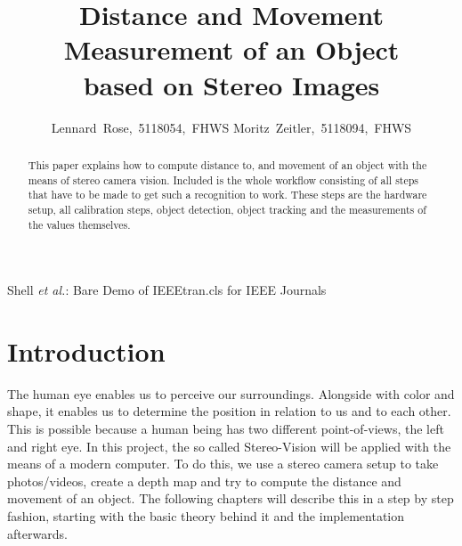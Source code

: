 \documentclass[journal,onecolumn]{IEEEtran}
\begin{document}
	\title{Distance and Movement Measurement of an Object\\ based on Stereo Images}

	\author{Lennard~Rose,~5118054,~FHWS
		Moritz~Zeitler,~5118094,~FHWS%
	}
	{Shell \MakeLowercase{\textit{et al.}}: Bare Demo of IEEEtran.cls for IEEE Journals}

	\maketitle

	\begin{abstract}
		\noindent
		This paper explains how to compute distance to, and movement of an object with the means of stereo camera vision.
		Included is the whole workflow consisting of all steps that have to be made to get such a recognition to work. These steps are the hardware setup, all calibration steps, object detection, object tracking and the measurements of the values themselves.
	\end{abstract}


	\IEEEpeerreviewmaketitle

	\section{Introduction}
\label{sec:einfuehrung}
\noindent
The human eye enables us to perceive our surroundings. Alongside with color and shape, it enables us to determine the position in relation to us and to each other. This is possible because a human being has two different point-of-views, the left and right eye. In this project, the so called Stereo-Vision will be applied with the means of a modern computer. To do this, we use a stereo camera setup to take photos/videos, create a depth map and try to compute the distance and movement of an object. The following chapters will describe this in a step by step fashion, starting with the basic theory behind it and the implementation afterwards.
\end{document}
